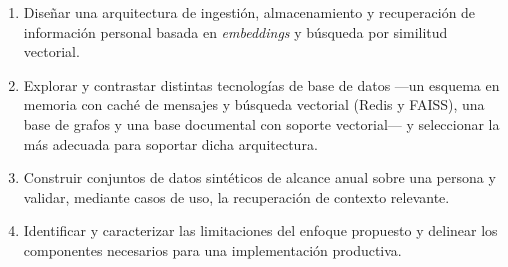\begin{enumerate}
    \item Diseñar una arquitectura de ingestión, almacenamiento y recuperación de información personal basada en \textit{embeddings} y búsqueda por similitud vectorial.
    \item Explorar y contrastar distintas tecnologías de base de datos —un esquema en memoria con caché de mensajes y búsqueda vectorial (Redis y FAISS), una base de grafos y una base documental con soporte vectorial— y seleccionar la más adecuada para soportar dicha arquitectura.
    \item Construir conjuntos de datos sintéticos de alcance anual sobre una persona y validar, mediante casos de uso, la recuperación de contexto relevante.
    \item Identificar y caracterizar las limitaciones del enfoque propuesto y delinear los componentes necesarios para una implementación productiva.
\end{enumerate}